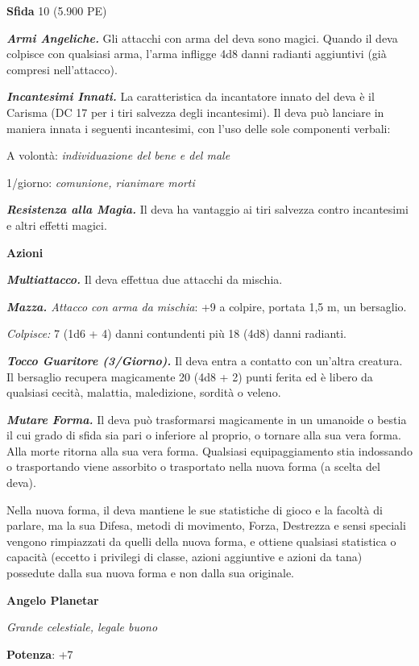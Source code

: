 \begin{multicols}{2}
\textbf{Sfida} 10 (5.900 PE)

\emph{\textbf{Armi Angeliche.}} Gli attacchi con arma del deva sono
magici. Quando il deva colpisce con qualsiasi arma, l'arma infligge 4d8
danni radianti aggiuntivi (già compresi nell'attacco).

\emph{\textbf{Incantesimi Innati.}} La caratteristica da incantatore
innato del deva è il Carisma (DC 17 per i tiri salvezza degli
incantesimi). Il deva può lanciare in maniera innata i seguenti
incantesimi, con l'uso delle sole componenti verbali:

A volontà: \emph{individuazione del bene e del male}

1/giorno: \emph{comunione, rianimare morti}

\emph{\textbf{Resistenza alla Magia.}} Il deva ha vantaggio ai tiri
salvezza contro incantesimi e altri effetti magici.

\textbf{Azioni}

\emph{\textbf{Multiattacco.}} Il deva effettua due attacchi da mischia.

\emph{\textbf{Mazza.} Attacco con arma da mischia}: +9 a colpire,
portata 1,5 m, un bersaglio.

\emph{Colpisce:} 7 (1d6 + 4) danni contundenti più 18 (4d8) danni
radianti.

\emph{\textbf{Tocco Guaritore (3/Giorno).}} Il deva entra a contatto con
un'altra creatura. Il bersaglio recupera magicamente 20 (4d8 + 2) punti
ferita ed è libero da qualsiasi cecità, malattia, maledizione, sordità o
veleno.

\emph{\textbf{Mutare Forma.}} Il deva può trasformarsi magicamente in un
umanoide o bestia il cui grado di sfida sia pari o inferiore al proprio,
o tornare alla sua vera forma. Alla morte ritorna alla sua vera forma.
Qualsiasi equipaggiamento stia indossando o trasportando viene assorbito
o trasportato nella nuova forma (a scelta del deva).

Nella nuova forma, il deva mantiene le sue statistiche di gioco e la
facoltà di parlare, ma la sua Difesa, metodi di movimento, Forza, Destrezza
e sensi speciali vengono rimpiazzati da quelli della nuova forma, e
ottiene qualsiasi statistica o capacità (eccetto i privilegi di classe,
azioni aggiuntive e azioni da tana) possedute dalla sua nuova forma e
non dalla sua originale.

\textbf{Angelo Planetar}

\emph{Grande celestiale, legale buono}

\textbf{Potenza}: +7


\end{multicols}
